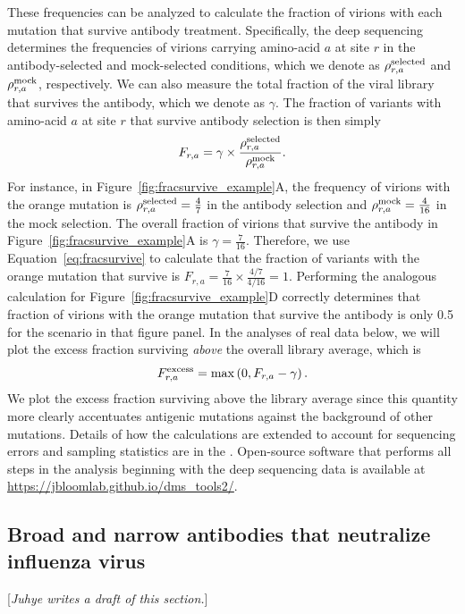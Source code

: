\documentclass[11pt]{article}
\newcommand{\comment}[1]{{\color{red}[\textsl{#1}]}}
\begin{document}
These frequencies can be analyzed to calculate the fraction of virions with each mutation that survive antibody treatment.
Specifically, the deep sequencing determines the frequencies of virions carrying amino-acid $a$ at site $r$ in the antibody-selected and mock-selected conditions, which we denote as $\rho_{r,a}^{\rm{selected}}$ and $\rho_{r,a}^{\rm{mock}}$, respectively.
We can also measure the total fraction of the viral library that survives the antibody, which we denote as $\gamma$.
The fraction of variants with amino-acid $a$ at site $r$ that survive antibody selection is then simply 
\begin{equation}
\label{eq:fracsurvive}
F_{r,a} = \gamma \times \frac{\rho_{r,a}^{\rm{selected}}}{\rho_{r,a}^{\rm{mock}}}.
\end{equation}
For instance, in Figure~\ref{fig:fracsurvive_example}A, the frequency of virions with the orange mutation is $\rho_{r,a}^{\rm{selected}} = \frac{4}{7}$ in the antibody selection and $\rho_{r,a}^{\rm{mock}} = \frac{4}{16}$ in the mock selection.
The overall fraction of virions that survive the antibody in Figure~\ref{fig:fracsurvive_example}A is $\gamma = \frac{7}{16}$.
Therefore, we use Equation~\ref{eq:fracsurvive} to calculate that the fraction of variants with the orange mutation that survive is $F_{r,a} = \frac{7}{16} \times \frac{4/7}{4/16} = 1$.
Performing the analogous calculation for Figure~\ref{fig:fracsurvive_example}D correctly determines that fraction of virions with the orange mutation that survive the antibody is only 0.5 for the scenario in that figure panel.
In the analyses of real data below, we will plot the excess fraction surviving \emph{above} the overall library average, which is
\begin{equation}
\label{eq:fracsurvive_excess}
F_{r,a}^{\rm{excess}} = \max\left(0, F_{r,a} - \gamma\right).
\end{equation}
We plot the excess fraction surviving above the library average since this quantity more clearly accentuates antigenic mutations against the background of other mutations.
Details of how the calculations are extended to account for sequencing errors and sampling statistics are in the .
Open-source software that performs all steps in the analysis beginning with the deep sequencing data is available at \url{https://jbloomlab.github.io/dms_tools2/}.

\subsection*{Broad and narrow antibodies that neutralize influenza virus}
\comment{Juhye writes a draft of this section.}
\end{document}
